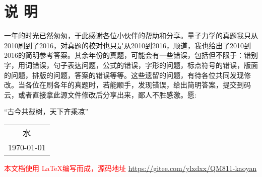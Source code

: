 




\chapter*{说 \quad 明}
\thispagestyle{empty}




一年的时光已然匆匆，于此感谢各位小伙伴的帮助和分享。量子力学的真题我只从2010刷到了2016，对真题的校对也只是从2010到2016，顺道，我也给出了2010到2016的简明参考答案。其余年份的真题，可能会有一些错误，包括但不限于：错别字，用词错误，句子表达问题，公式的错误，字形的问题，标点符号的错误，版面的问题，排版的问题，答案的错误等等。这些遗留的问题，有待各位共同发现修改。当各位在刷各年的真题时，若能顺手，发现错误，给出简明答案，提交到码云，或者直接拿此源文件修改后分享出来，鄙人不胜感激。愿:
\begin{center}
	\kaishu 
	“古今共载树，天下齐乘凉”
\end{center}
\begin{center}
	\flushright
\begin{tabular}{c}
	水   \\
	\today
\end{tabular}	
\end{center}

\vfil
\noindent
\textcolor{red}{本文档使用 \LaTeX 编写而成，源码地址 \url{https://gitee.com/ylxdxx/QM811-kaoyan}  }
\vfil

\pagestyle{mypagestyle}

